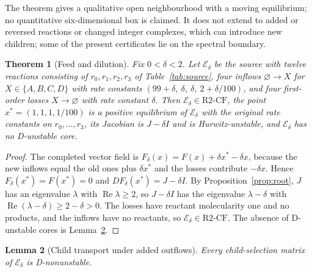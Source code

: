 \documentclass[11pt,a4paper]{article}
\theoremstyle{plain}
\newtheorem{theorem}{Theorem}[section]
\newtheorem{lemma}[theorem]{Lemma}
\theoremstyle{definition}
\theoremstyle{remark}
\newcommand{\Real}{\operatorname{Re}}
\newcommand{\xs}{x^{*}}
\newcommand{\Rcf}{\mathrm{R2\text{-}CF}}
\begin{document}
The theorem gives a qualitative open neighbourhood with a moving equilibrium; no quantitative six-dimensional box is claimed. It does not extend to added or reversed reactions or changed integer complexes, which can introduce new children; some of the present certificates lie on the spectral boundary.

\begin{theorem}[Feed and dilution]\label{thm:dilution}
Fix $0<\delta<2$. Let $\mathcal E_\delta$ be the source with twelve reactions consisting of $r_0,r_1,r_2,r_3$ of Table~\ref{tab:source}, four inflows $\varnothing\to X$ for $X\in\{A,B,C,D\}$ with rate constants $(99+\delta,\ \delta,\ \delta,\ 2+\delta/100)$, and four first-order losses $X\to\varnothing$ with rate constant $\delta$. Then $\mathcal E_\delta\in\Rcf$, the point $\xs=(1,1,1,1/100)$ is a positive equilibrium of $\mathcal E_\delta$ with the original rate constants on $r_0,\dots,r_3$, its Jacobian is $J-\delta I$ and is Hurwitz-unstable, and $\mathcal E_\delta$ has no D-unstable core.
\end{theorem}

\begin{proof}
The completed vector field is $F_\delta(x)=F(x)+\delta\xs-\delta x$, because the new inflows equal the old ones plus $\delta\xs$ and the losses contribute $-\delta x$. Hence $F_\delta(\xs)=F(\xs)=0$ and $DF_\delta(\xs)=J-\delta I$. By Proposition~\ref{prop:root}, $J$ has an eigenvalue $\lambda$ with $\Real\lambda\ge2$, so $J-\delta I$ has the eigenvalue $\lambda-\delta$ with $\Real(\lambda-\delta)\ge2-\delta>0$. The losses have reactant molecularity one and no products, and the inflows have no reactants, so $\mathcal E_\delta\in\Rcf$. The absence of D-unstable cores is Lemma~\ref{lem:transport}.
\end{proof}

\begin{lemma}[Child transport under added outflows]\label{lem:transport}
Every child-selection matrix of $\mathcal E_\delta$ is D-nonunstable.
\end{lemma}
\end{document}
